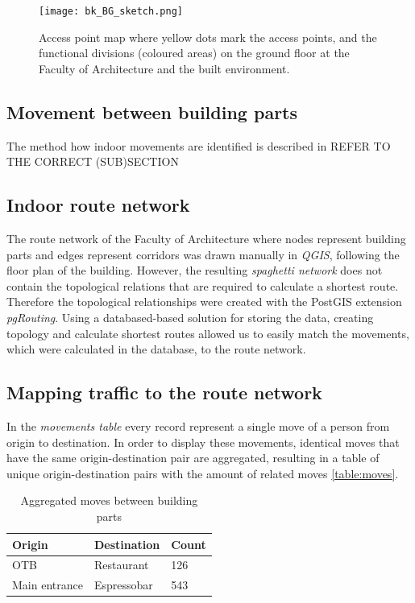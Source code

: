 \begin{figure}[H]
\centering
\texttt{[image: bk\_BG\_sketch.png]}
\captionsetup{justification=centering}
\caption{Access point map where yellow dots mark the access points, and the functional divisions (coloured areas) on the ground floor at the Faculty of Architecture and the built environment.}
\label{figure:BK_sketch}
\end{figure}

\subsection{Movement between building parts}
The method how indoor movements are identified is described in REFER TO THE
CORRECT (SUB)SECTION

\subsection{Indoor route network}
The route network of the Faculty of Architecture where nodes represent building
parts and edges represent corridors was drawn manually in \textit{QGIS},
following the floor plan of the building. However, the resulting 
\textit{spaghetti network}
does not contain the topological relations that are required to calculate
a shortest route. Therefore the topological relationships were created with the
PostGIS extension \textit{pgRouting}. Using a databased-based solution for
storing the data, creating topology and calculate shortest routes allowed us to
easily match the movements, which were calculated in the database, to the route
network.

\subsection{Mapping traffic to the route network}
In the \textit{movements table} every record represent a single move of a person
from origin to destination. In order to display these movements, identical moves
that have the same origin-destination pair are aggregated, resulting in a table
of unique origin-destination pairs with the amount of related moves
\autoref{table:moves}.

\begin{table}[H]
\centering
\captionsetup{justification=centering}
\caption{Aggregated moves between building parts}
\label{table:moves}
\begin{tabular}{@{}lll@{}}
\toprule
Origin        & Destination & Count \\ \midrule
OTB           & Restaurant  & 126   \\
Main entrance & Espressobar & 543   \\ \bottomrule
\end{tabular}
\end{table}

